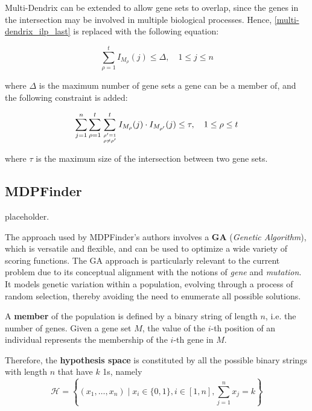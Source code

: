 Multi-Dendrix can be extended to allow gene sets to overlap, since the genes in the intersection may be involved in multiple biological processes. Hence, \cref{multi-dendrix_ilp_last} is replaced with the following equation:

\begin{equation}
    \sum_{\rho = 1}^t {I_{M_\rho}(j) \le \Delta}, \quad 1 \le j \le n
\end{equation}

where $\Delta$ is the maximum number of gene sets a gene can be a member of, and the following constraint is added:

\begin{equation}
    \sum_{j = 1}^n {\sum_{\rho = 1}^t \sum_{\rho' = 1 \atop \rho \neq \rho'}^t {{I_{M_\rho} (j) \cdot I_{M_{\rho'}} (j)}}} \le \tau, \quad 1 \le \rho \le t
\end{equation}

where $\tau$ is the maximum size of the intersection between two gene sets.

\subsection{MDPFinder}

placeholder. 

The approach used by MDPFinder's authors involves a \textbf{GA} (\textit{Genetic Algorithm}), which is versatile and flexible, and can be used to optimize a wide variety of scoring functions. The GA approach is particularly relevant to the current problem due to its conceptual alignment with the notions of \textit{gene} and \textit{mutation}. It models genetic variation within a population, evolving through a process of random selection, thereby avoiding the need to enumerate all possible solutions.

\begin{definition}
    A \textbf{member} of the population is defined by a binary string of length $n$, i.e. the number of genes. Given a gene set $M$, the value of the $i$-th position of an individual represents the membership of the $i$-th gene in $M$.

    Therefore, the \textbf{hypothesis space} is constituted by all the possible binary strings with length $n$ that have $k$ 1s, namely $$\mathcal H = \left\{(x_1, \ldots, x_n) \mid x_i \in \{0, 1\}, i \in [1, n], \sum_{j = 1}^n {x_j} = k \right\}$$
\end{definition}

